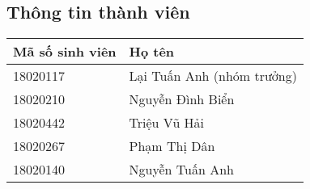 \documentclass[./../main.tex]{subfiles}
\begin{document}
\subsection{Thông tin thành viên}
\begin{table}[H]
\begin{tabular}{|p{}|p{}|}
\hline
\textbf{Mã số sinh viên} & \textbf{Họ tên}             \\ \hline
18020117                 & Lại Tuấn Anh (nhóm  trưởng) \\ \hline
18020210                 & Nguyễn Đình Biển            \\ \hline
18020442                 & Triệu Vũ Hải                \\ \hline
18020267                 & Phạm Thị Dân                \\ \hline
18020140                 & Nguyễn Tuấn Anh             \\ \hline
\end{tabular}
\end{table}
\end{document}
